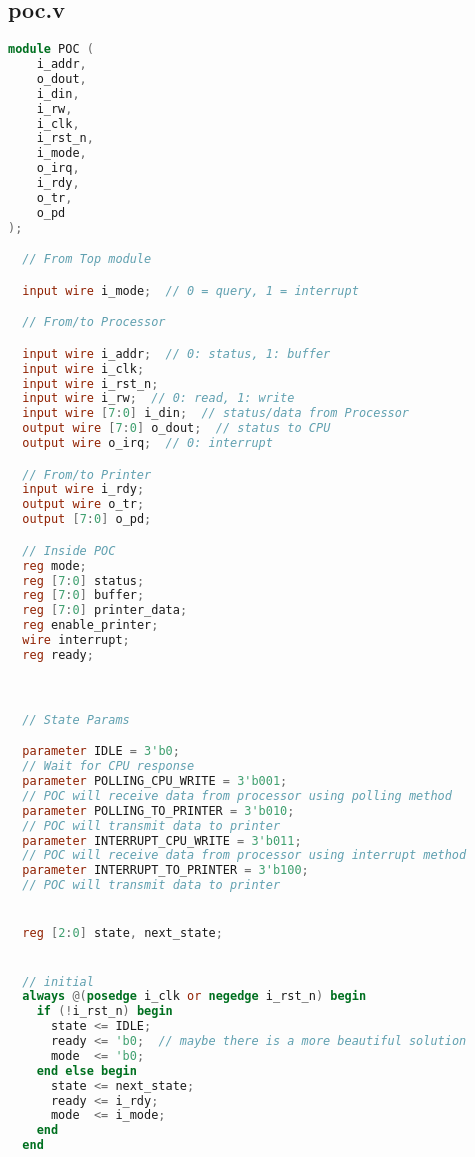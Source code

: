 \documentclass[lang=cn,a4paper,newtx]{elegantpaper}
\begin{document}
\subsection{poc.v}
\begin{lstlisting}[language=verilog]
module POC (
    i_addr,
    o_dout,
    i_din,
    i_rw,
    i_clk,
    i_rst_n,
    i_mode,
    o_irq,
    i_rdy,
    o_tr,
    o_pd
);

  // From Top module

  input wire i_mode;  // 0 = query, 1 = interrupt

  // From/to Processor

  input wire i_addr;  // 0: status, 1: buffer    
  input wire i_clk;
  input wire i_rst_n;
  input wire i_rw;  // 0: read, 1: write
  input wire [7:0] i_din;  // status/data from Processor
  output wire [7:0] o_dout;  // status to CPU
  output wire o_irq;  // 0: interrupt

  // From/to Printer
  input wire i_rdy;
  output wire o_tr;
  output [7:0] o_pd;

  // Inside POC
  reg mode;
  reg [7:0] status;
  reg [7:0] buffer;
  reg [7:0] printer_data;
  reg enable_printer;
  wire interrupt;
  reg ready;



  // State Params

  parameter IDLE = 3'b0;
  // Wait for CPU response
  parameter POLLING_CPU_WRITE = 3'b001;
  // POC will receive data from processor using polling method
  parameter POLLING_TO_PRINTER = 3'b010;
  // POC will transmit data to printer
  parameter INTERRUPT_CPU_WRITE = 3'b011;
  // POC will receive data from processor using interrupt method
  parameter INTERRUPT_TO_PRINTER = 3'b100;
  // POC will transmit data to printer


  reg [2:0] state, next_state;


  // initial 
  always @(posedge i_clk or negedge i_rst_n) begin
    if (!i_rst_n) begin
      state <= IDLE;
      ready <= 'b0;  // maybe there is a more beautiful solution
      mode  <= 'b0;
    end else begin
      state <= next_state;
      ready <= i_rdy;
      mode  <= i_mode;
    end
  end


\end{lstlisting}
\end{document}
